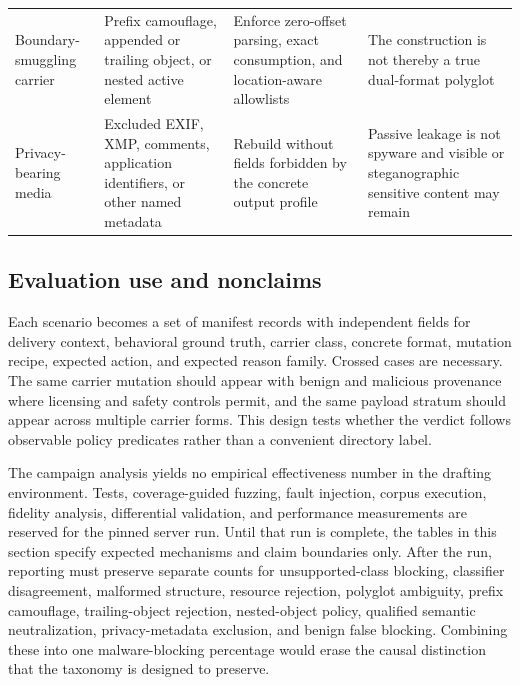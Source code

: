 \begin{longtable}{L{0.15\textwidth}L{0.20\textwidth}L{0.31\textwidth}L{0.23\textwidth}}
Boundary-smuggling carrier & Prefix camouflage, appended or trailing object, or nested active element & Enforce zero-offset parsing, exact consumption, and location-aware allowlists & The construction is not thereby a true dual-format polyglot \\
Privacy-bearing media & Excluded EXIF, XMP, comments, application identifiers, or other named metadata & Rebuild without fields forbidden by the concrete output profile & Passive leakage is not spyware and visible or steganographic sensitive content may remain \\
\end{longtable}
\endgroup

\subsection{Evaluation use and nonclaims}

Each scenario becomes a set of manifest records with independent fields for
delivery context, behavioral ground truth, carrier class, concrete format,
mutation recipe, expected action, and expected reason family. Crossed cases are
necessary. The same carrier mutation should appear with benign and malicious
provenance where licensing and safety controls permit, and the same payload
stratum should appear across multiple carrier forms. This design tests whether
the verdict follows observable policy predicates rather than a convenient
directory label.

The campaign analysis yields no empirical effectiveness number in the drafting
environment. Tests, coverage-guided fuzzing, fault injection, corpus execution,
fidelity analysis, differential validation, and performance measurements are
reserved for the pinned server run. Until that run is complete, the tables in
this section specify expected mechanisms and claim boundaries only. After the
run, reporting must preserve separate counts for unsupported-class blocking,
classifier disagreement, malformed structure, resource rejection, polyglot
ambiguity, prefix camouflage, trailing-object rejection, nested-object policy,
qualified semantic neutralization, privacy-metadata exclusion, and benign false
blocking. Combining these into one malware-blocking percentage would erase the
causal distinction that the taxonomy is designed to preserve.
